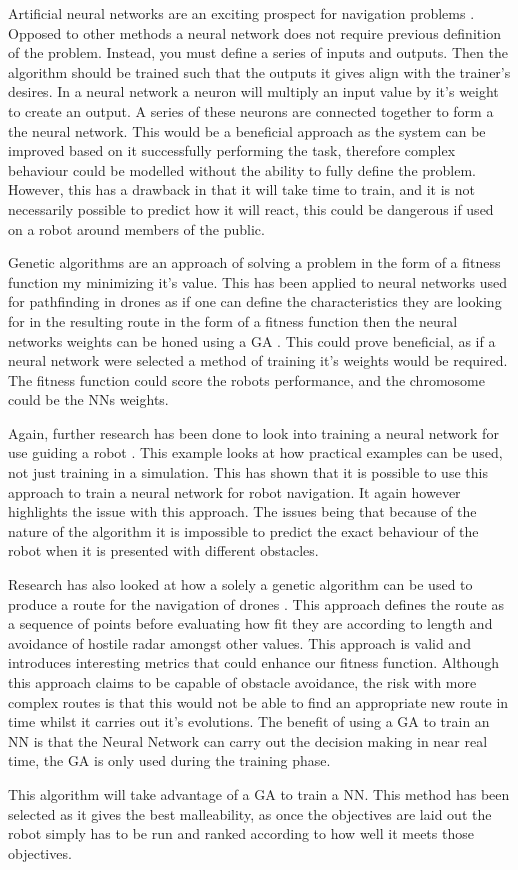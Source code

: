Artificial neural networks are an exciting prospect for navigation problems \cite{Deb2011}. Opposed to other methods a neural network does not require previous definition of the problem. Instead, you must define a series of inputs and outputs. Then the algorithm should be trained such that the outputs it gives align with the trainer's desires. In a neural network a neuron will multiply an input value by it's weight to create an output. A series of these neurons are connected together to form a the neural network. This would be a beneficial approach as the system can be improved based on it successfully performing the task, therefore complex behaviour could be modelled without the ability to fully define the problem. However, this has a drawback in that it will take time to train, and it is not necessarily possible to predict how it will react, this could be dangerous if used on a robot around members of the public.

Genetic algorithms are an approach of solving a problem in the form of a fitness function my minimizing it's value. This has been applied to neural networks used for pathfinding in drones as if one can define the characteristics they are looking for in the resulting route in the form of a fitness function then the neural networks weights can be honed using a GA \cite{Gautam2014}. This could prove beneficial, as if a neural network were selected a method of training it's weights would be required. The fitness function could score the robots performance, and the chromosome could be the NNs weights.

Again, further research has been done to look into training a neural network for use guiding a robot \cite{Floreano}. This example looks at how practical examples can be used, not just training in a simulation. This has shown that it is possible to use this approach to train a neural network for robot navigation. It again however highlights the issue with this approach. The issues being that because of the nature of the algorithm it is impossible to predict the exact behaviour of the robot when it is presented with different obstacles.

Research has also looked at how a solely a genetic algorithm can be used to produce a route for the navigation of drones \cite{Zheng2005, Zhang2015}. This approach defines the route as a sequence of points before evaluating how fit they are according to length and avoidance of hostile radar amongst other values. This approach is valid and introduces interesting metrics that could enhance our fitness function. Although this approach claims to be capable of obstacle avoidance, the risk with more complex routes is that this would not be able to find an appropriate new route in time whilst it carries out it's evolutions. The benefit of using a GA to train an NN is that the Neural Network can carry out the decision making in near real time, the GA is only used during the training phase.

This algorithm will take advantage of a GA to train a NN. This method has been selected as it gives the best malleability, as once the objectives are laid out the robot simply has to be run and ranked according to how well it meets those objectives. 